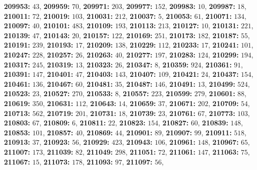 \textsf{\bfseries 209953:} $43$, \textsf{\bfseries 209959:} $70$, \textsf{\bfseries 209971:} $203$, \textsf{\bfseries 209977:} $152$, \textsf{\bfseries 209983:} $10$, \textsf{\bfseries 209987:} $18$, \textsf{\bfseries 210011:} $72$, \textsf{\bfseries 210019:} $103$, \textsf{\bfseries 210031:} $212$, \textsf{\bfseries 210037:} $5$, \textsf{\bfseries 210053:} $61$, \textsf{\bfseries 210071:} $134$, \textsf{\bfseries 210097:} $40$, \textsf{\bfseries 210101:} $483$, \textsf{\bfseries 210109:} $193$, \textsf{\bfseries 210113:} $213$, \textsf{\bfseries 210127:} $10$, \textsf{\bfseries 210131:} $221$, \textsf{\bfseries 210139:} $47$, \textsf{\bfseries 210143:} $20$, \textsf{\bfseries 210157:} $122$, \textsf{\bfseries 210169:} $251$, \textsf{\bfseries 210173:} $182$, \textsf{\bfseries 210187:} $55$, \textsf{\bfseries 210191:} $239$, \textsf{\bfseries 210193:} $17$, \textsf{\bfseries 210209:} $138$, \textsf{\bfseries 210229:} $112$, \textsf{\bfseries 210233:} $17$, \textsf{\bfseries 210241:} $101$, \textsf{\bfseries 210247:} $228$, \textsf{\bfseries 210257:} $26$, \textsf{\bfseries 210263:} $40$, \textsf{\bfseries 210277:} $197$, \textsf{\bfseries 210283:} $124$, \textsf{\bfseries 210299:} $194$, \textsf{\bfseries 210317:} $245$, \textsf{\bfseries 210319:} $13$, \textsf{\bfseries 210323:} $26$, \textsf{\bfseries 210347:} $8$, \textsf{\bfseries 210359:} $924$, \textsf{\bfseries 210361:} $91$, \textsf{\bfseries 210391:} $147$, \textsf{\bfseries 210401:} $47$, \textsf{\bfseries 210403:} $143$, \textsf{\bfseries 210407:} $109$, \textsf{\bfseries 210421:} $24$, \textsf{\bfseries 210437:} $154$, \textsf{\bfseries 210461:} $136$, \textsf{\bfseries 210467:} $60$, \textsf{\bfseries 210481:} $35$, \textsf{\bfseries 210487:} $146$, \textsf{\bfseries 210491:} $13$, \textsf{\bfseries 210499:} $524$, \textsf{\bfseries 210523:} $23$, \textsf{\bfseries 210527:} $270$, \textsf{\bfseries 210533:} $8$, \textsf{\bfseries 210557:} $223$, \textsf{\bfseries 210599:} $279$, \textsf{\bfseries 210601:} $88$, \textsf{\bfseries 210619:} $350$, \textsf{\bfseries 210631:} $112$, \textsf{\bfseries 210643:} $14$, \textsf{\bfseries 210659:} $37$, \textsf{\bfseries 210671:} $202$, \textsf{\bfseries 210709:} $54$, \textsf{\bfseries 210713:} $562$, \textsf{\bfseries 210719:} $201$, \textsf{\bfseries 210731:} $18$, \textsf{\bfseries 210739:} $23$, \textsf{\bfseries 210761:} $67$, \textsf{\bfseries 210773:} $103$, \textsf{\bfseries 210803:} $67$, \textsf{\bfseries 210809:} $6$, \textsf{\bfseries 210811:} $22$, \textsf{\bfseries 210823:} $154$, \textsf{\bfseries 210827:} $60$, \textsf{\bfseries 210839:} $148$, \textsf{\bfseries 210853:} $101$, \textsf{\bfseries 210857:} $40$, \textsf{\bfseries 210869:} $44$, \textsf{\bfseries 210901:} $89$, \textsf{\bfseries 210907:} $99$, \textsf{\bfseries 210911:} $518$, \textsf{\bfseries 210913:} $37$, \textsf{\bfseries 210923:} $56$, \textsf{\bfseries 210929:} $423$, \textsf{\bfseries 210943:} $106$, \textsf{\bfseries 210961:} $148$, \textsf{\bfseries 210967:} $65$, \textsf{\bfseries 211007:} $173$, \textsf{\bfseries 211039:} $82$, \textsf{\bfseries 211049:} $298$, \textsf{\bfseries 211051:} $72$, \textsf{\bfseries 211061:} $147$, \textsf{\bfseries 211063:} $75$, \textsf{\bfseries 211067:} $15$, \textsf{\bfseries 211073:} $178$, \textsf{\bfseries 211093:} $97$, \textsf{\bfseries 211097:} $56$, 
